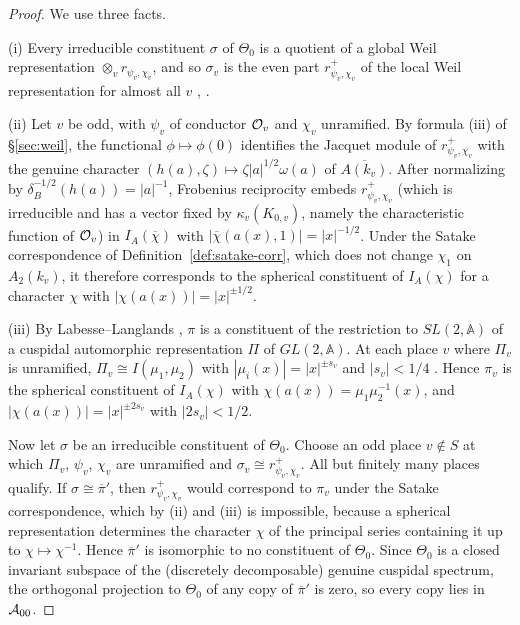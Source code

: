 \documentclass[12pt,letterpaper,openany]{book}
\theoremstyle{plain}
\theoremstyle{definition}
\theoremstyle{remark}
\theoremstyle{remark}
\begin{document}
\begin{proof}
We use three facts.

(i) Every irreducible constituent $\sigma$ of $\Theta_0$ is a quotient of
a global Weil representation $\otimes_v r_{\psi_v,\chi_v}$, and so
$\sigma_v$ is the even part $r^+_{\psi_v,\chi_v}$ of the local Weil
representation for almost all $v$ \cite{GePS}, \cite{Ge2}.

(ii) Let $v$ be odd, with $\psi_v$ of conductor ${\cal O}_v$ and $\chi_v$
unramified. By formula (iii) of \S\ref{sec:weil}, the functional
$\phi\mapsto\phi(0)$ identifies the Jacquet module of $r^+_{\psi_v,\chi_v}$
with the genuine character $(h(a),\zeta)\mapsto\zeta|a|^{1/2}\omega(a)$ of
$\overline{A(k_v)}$. After normalizing by $\delta_B^{-1/2}(h(a))=|a|^{-1}$,
Frobenius reciprocity embeds $r^+_{\psi_v,\chi_v}$ (which is irreducible
and has a vector fixed by $\kappa_v(K_{0,v})$, namely the characteristic
function of ${\cal O}_v$) in $I_A(\overline\chi)$ with
$|\overline\chi(a(x),1)|=|x|^{-1/2}$. Under the Satake correspondence of
Definition~\ref{def:satake-corr}, which does not change $\chi_1$ on
$A_2(k_v)$, it therefore corresponds to the spherical constituent of
$I_A(\chi)$ for a character $\chi$ with $|\chi(a(x))|=|x|^{\pm1/2}$.

(iii) By Labesse--Langlands \cite{LL}, $\pi$ is a constituent of the
restriction to $SL(2,{\mathbb{A}})$ of a cuspidal automorphic
representation $\Pi$ of $GL(2,{\mathbb{A}})$. At each place $v$ where $\Pi_v$
is unramified, $\Pi_v\cong I(\mu_1,\mu_2)$ with
$|\mu_i(x)|=|x|^{\pm s_v}$ and $|s_v|<1/4$ \cite{GJ78}. Hence $\pi_v$ is
the spherical constituent of $I_A(\chi)$ with $\chi(a(x))=\mu_1\mu_2^{-1}(x)$,
and $|\chi(a(x))|=|x|^{\pm 2s_v}$ with $|2s_v|<1/2$.

Now let $\sigma$ be an irreducible constituent of $\Theta_0$. Choose an odd
place $v\notin S$ at which $\Pi_v$, $\psi_v$, $\chi_v$ are unramified and
$\sigma_v\cong r^+_{\psi_v,\chi_v}$. All but finitely many places qualify.
If $\sigma\cong\overline\pi'$, then $r^+_{\psi_v,\chi_v}$ would correspond
to $\pi_v$ under the Satake correspondence, which by (ii) and (iii)
is impossible, because a spherical representation determines the
character $\chi$ of the principal series containing it up to
$\chi\mapsto\chi^{-1}$. Hence $\overline\pi'$ is isomorphic to no
constituent of $\Theta_0$. Since $\Theta_0$ is a closed invariant
subspace of the (discretely decomposable) genuine cuspidal spectrum, the
orthogonal projection to $\Theta_0$ of any copy of $\overline\pi'$ is
zero, so every copy lies in ${\cal A}_{00}$.
\end{proof}
\end{document}
